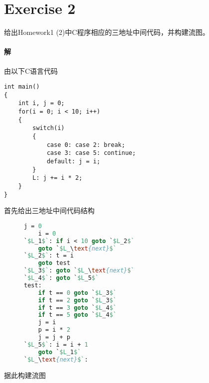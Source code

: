 \documentclass{article}
\begin{document}
\section*{Exercise 2}
给出Homework1 (2)中C程序相应的三地址中间代码，并构建流图。

\begin{multicols}{2}
\paragraph{解}
由以下C语言代码

\begin{lstlisting}[style = C]
int main()
{
    int i, j = 0;
    for(i = 0; i < 10; i++)
    {
        switch(i)
        {
            case 0: case 2: break;
            case 3: case 5: continue;
            default: j = i;
        }
        L: j += i * 2;
    }
}
\end{lstlisting}

首先给出三地址中间代码结构
\begin{figure}[H]
    \centering
    \begin{lstlisting}[language = Pascal, alsolanguage = C]
    j = 0
    i = 0
`$L_1$`: if i < 10 goto `$L_2$`
    goto `$L_\text{next}$`
`$L_2$`: t = i
    goto test
`$L_3$`: goto `$L_\text{next}$`
`$L_4$`: goto `$L_5$`
test:
    if t == 0 goto `$L_3$`
    if t == 2 goto `$L_3$`
    if t == 3 goto `$L_4$`
    if t == 5 goto `$L_4$`
    j = i
    p = i * 2
    j = j + p
`$L_5$`: i = i + 1
    goto `$L_1$`
`$L_\text{next}$`:
    \end{lstlisting}
\end{figure}

据此构建流图
\end{multicols}
\end{document}

